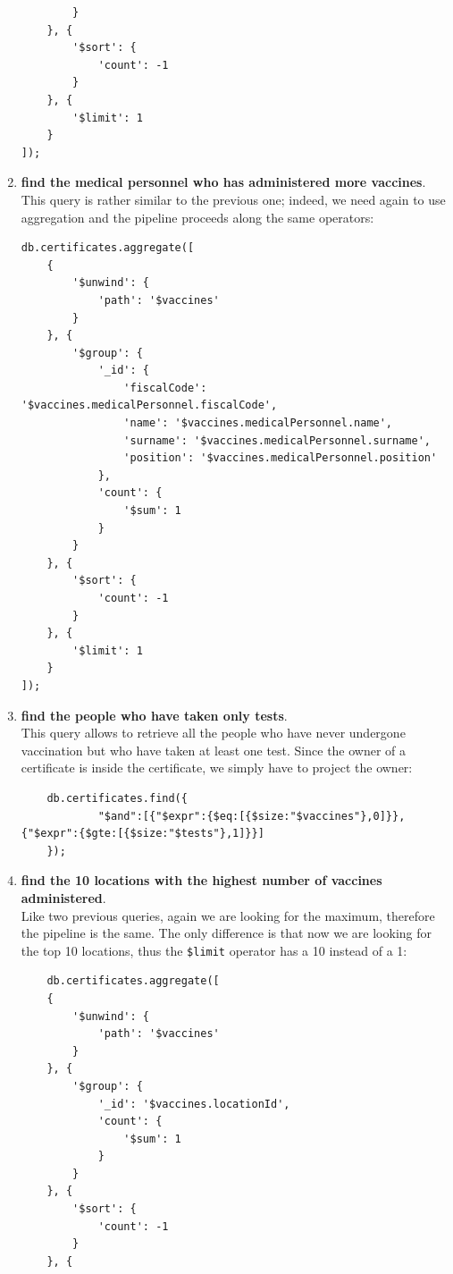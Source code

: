 \documentclass{article}
\begin{document}
\begin{enumerate}
\begin{lstlisting}
        }
    }, {
        '$sort': {
            'count': -1
        }
    }, {
        '$limit': 1
    }
]);
    \end{lstlisting}
    \item \textbf{find the medical personnel who has administered more vaccines}.\\This query is rather similar to the previous one; indeed, we need again to use aggregation and the pipeline proceeds along the same operators:
    \begin{lstlisting}
db.certificates.aggregate([
    {
        '$unwind': {
            'path': '$vaccines'
        }
    }, {
        '$group': {
            '_id': {
                'fiscalCode': '$vaccines.medicalPersonnel.fiscalCode', 
                'name': '$vaccines.medicalPersonnel.name', 
                'surname': '$vaccines.medicalPersonnel.surname', 
                'position': '$vaccines.medicalPersonnel.position'
            }, 
            'count': {
                '$sum': 1
            }
        }
    }, {
        '$sort': {
            'count': -1
        }
    }, {
        '$limit': 1
    }
]);
\end{lstlisting}
    \item \textbf{find the people who have taken only tests}.\\
    This query allows to retrieve all the people who have never undergone vaccination but who have taken at least one test. Since the owner of a certificate is inside the certificate, we simply have to project the owner: 
    \begin{lstlisting}
    db.certificates.find({
            "$and":[{"$expr":{$eq:[{$size:"$vaccines"},0]}},{"$expr":{$gte:[{$size:"$tests"},1]}}]
    });
\end{lstlisting}
    \item \textbf{find the 10 locations with the highest number of vaccines administered}.\\
    Like two previous queries, again we are looking for the maximum, therefore the pipeline is the same. The only difference is that now we are looking for the top 10 locations, thus the \verb|$limit| operator has a 10 instead of a 1:
    \begin{lstlisting}
    db.certificates.aggregate([
    {
        '$unwind': {
            'path': '$vaccines'
        }
    }, {
        '$group': {
            '_id': '$vaccines.locationId', 
            'count': {
                '$sum': 1
            }
        }
    }, {
        '$sort': {
            'count': -1
        }
    }, {

\end{lstlisting}
\end{enumerate}
\end{document}
